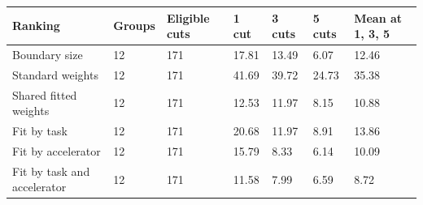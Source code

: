 \begin{tabular}{@{}lllllll@{}}
\toprule
Ranking & Groups & Eligible cuts & 1 cut & 3 cuts & 5 cuts & Mean at 1, 3, 5 \\
\midrule
Boundary size & 12 & 171 & 17.81 & 13.49 & 6.07 & 12.46 \\
Standard weights & 12 & 171 & 41.69 & 39.72 & 24.73 & 35.38 \\
Shared fitted weights & 12 & 171 & 12.53 & 11.97 & 8.15 & 10.88 \\
Fit by task & 12 & 171 & 20.68 & 11.97 & 8.91 & 13.86 \\
Fit by accelerator & 12 & 171 & 15.79 & 8.33 & 6.14 & 10.09 \\
Fit by task and accelerator & 12 & 171 & 11.58 & 7.99 & 6.59 & 8.72 \\
\bottomrule
\end{tabular}

